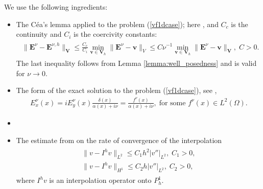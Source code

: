We use the following ingredients:
\begin{itemize}
 \item The C\'ea's lemma applied to the problem (\ref{vf1dcase}); here , and $C_c$ is the continuity and $C_i$ is the coercivity constants:
\begin{align}
\label{eq:cea}
\begin{split}
 \|\mathbf{E}^{\nu}-\mathbf{E}^{\nu,h}\|_{\mathbf{V}}\leq \frac{C_c}{C_i}\min_{\mathbf{v}\in \mathbf{V}_h}\|\mathbf{E}^{\nu}-\mathbf{v}\|_{V}
 \leq C\nu^{-1}\min_{\mathbf{v}\in \mathbf{V}_h}\|\mathbf{E}^{\nu}-\mathbf{v}\|_{\mathbf{V}},\; C>0.
 \end{split}
\end{align}
The last inequality follows from Lemma \ref{lemma:well_posedness} and is valid for $\nu\rightarrow 0$.   
\item The form of the exact solution to the problem (\ref{vf1dcase}), see \cite{Despres_2014},
\begin{align}
\label{eq:exact}
 E_x^{\nu}(x)=iE_{y}^{\nu}(x)\frac{\delta(x)}{\alpha(x)+i\nu}=\frac{f^{\nu}(x)}{\alpha(x)+i\nu}, \; \text{for some }f^{\nu}(x)\in L^2(\Omega).
\end{align}
\item {}
\item The estimate from \cite[Chapter 0]{brenner} on the rate of convergence of the interpolation 
\begin{align}
\label{eq:interp}
\begin{split}
 \|v-I^{h}v\|_{L^2}\leq C_1h^2\left|v''\right|_{L^2},\; C_1>0,\\
 \|v-I^{h}v\|_{H^1}\leq C_2h|v''|_{L^2},\; C_2>0, 
 \end{split}
\end{align}
where $I^{h}v$ is an interpolation operator onto $P_{h}^{1}$. 
\end{itemize}
